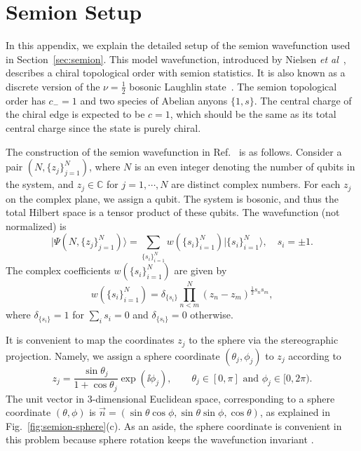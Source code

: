 \documentclass[12pt, nofootinbib]{article}
\theoremstyle{plain}
\theoremstyle{assumption}
\theoremstyle{definition}
\theoremstyle{plain}
\theoremstyle{plain}
\theoremstyle{plain}
\theoremstyle{plain}
\theoremstyle{plain}
\begin{document}
\section{Semion Setup}\label{app:semion} 

In this appendix, we explain the detailed setup of the semion wavefunction used in Section~\ref{sec:semion}.  This model wavefunction, introduced by Nielsen \emph{et al}~\cite{Nielsen2012}, describes a chiral topological order with semion statistics. It is also known as a discrete version of the $\nu=\frac{1}{2}$ bosonic Laughlin state~\cite{Laughlin1983,Kalmeyer1987}. The semion topological order has  $c_-=1$ and two species of Abelian anyons $\{1, s\}$. The central charge of the chiral edge is expected to be $c=1$, which should be the same as its total central charge since the state is purely chiral. 


The construction of the semion wavefunction in Ref.~\cite{Nielsen2012} is as follows.  Consider a pair $(N, \{z_j\}_{j=1}^N)$, where $N$ is an even integer denoting the number of qubits in the system, and $z_j\in \mathbb{C}$ for $j= 1, \cdots, N$ are distinct complex numbers. For each  $z_j$ on the complex plane, we assign a qubit. 
The system is bosonic, and thus the total Hilbert space is a tensor product of these qubits. 
The wavefunction (not normalized) is
\begin{equation}
\vert \Psi(N, \{z_j\}_{j=1}^N) \rangle = \sum_{\{s_i\}_{i=1}^N} w(\{s_i\}_{i=1}^N) \vert \{s_i\}_{i=1}^N \rangle, \quad s_i= \pm 1.
\end{equation}
The complex coefficients $w(\{s_i\}_{i=1}^N)$ are given by 
\begin{equation}
w(\{s_i\}_{i=1}^N)= \delta_{\{s_i\}} \prod_{n<m}^N (z_n-z_m)^{\frac{1}{2} s_n s_m},
\end{equation}
where $\delta_{\{s_i\}}=1$ for $\sum_i s_i =0$ and $\delta_{\{s_i\}}=0$ otherwise. 

It is convenient to map the coordinates $z_j$ to the sphere via the stereographic projection.
Namely, we assign a sphere coordinate $(\theta_j, \phi_j)$ to $z_j$ according to
\begin{equation}
z_j= \frac{\sin\theta_j}{1+ \cos\theta_j} \exp\left(\ii \phi_j\right), \qquad  \theta_j\in [0,\pi] \textrm{ and } \phi_j\in [0,2\pi).
\end{equation}
The unit vector in 3-dimensional Euclidean space, corresponding to a sphere coordinate $(\theta,\phi)$ is $\vec{n}= (\sin\theta \cos\phi, \sin\theta \sin\phi,\cos\theta)$, as explained in Fig.~\ref{fig:semion-sphere}(c). 
As an aside, the sphere coordinate is convenient in this problem because sphere rotation keeps the wavefunction invariant \cite{Nielsen2012}. 
\end{document}
